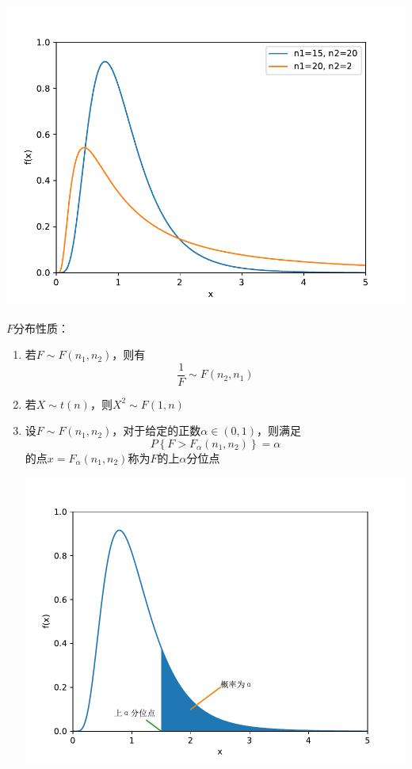 \documentclass[12pt,a4paper,UTF8]{book}
\begin{document}
\begin{enumerate}
\begin{center}\includegraphics[scale=0.6]{./figure/F.pdf}\end{center}
$F$分布性质：
\begin{enumerate}
\item 若$F\sim F\left(n_1,n_2\right)$，则有
\[\frac{1}{F}\sim F\left(n_2,n_1\right)\]
\item 若$X\sim t\left(n\right)$，则$X^2\sim F\left(1,n\right)$
\item 设$F\sim F\left(n_1,n_2\right)$，对于给定的正数$\alpha\in\left(0,1\right)$，则满足
\[P\left\{F>F_{\alpha}\left(n_1,n_2\right)\right\}=\alpha\]
的点$x=F_{\alpha}\left(n_1,n_2\right)$称为$F$的上$\alpha$分位点
\begin{center}\includegraphics[scale=0.6]{./figure/F_alpha.pdf}\end{center}
\end{enumerate}
\end{enumerate}
\end{document}
